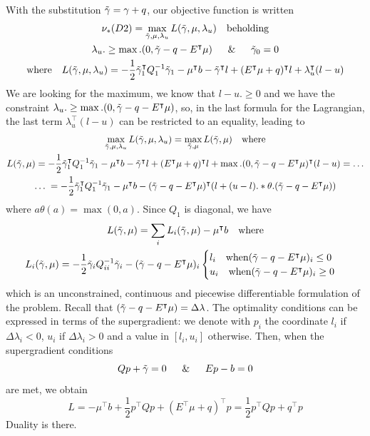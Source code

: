\documentclass[10pt,twoside,book,a5paper]{ncc}
\begin{document}
With the substitution $\Tilde{\gamma} = \gamma + q$, our objective function is written
    \begin{gather*}
    \nu_*(D2) = \max_{\Tilde{\gamma}, \mu, \lambda_u} L(\Tilde{\gamma}, \mu, \lambda_u) \quad \textrm{beholding} \\
    \lambda_u .\ge \max.(0, \Tilde{\gamma} - q - E^\intercal\mu) \quad \And \quad \Tilde{\gamma}_0 = 0    \\
    \textrm{where} \quad L(\Tilde{\gamma}, \mu, \lambda_u) = -\frac{1}{2} \Tilde{\gamma}_1^\intercal Q_1^{-1}\Tilde{\gamma}_1 - \mu^\intercal b - \Tilde{\gamma}^\intercal l + (E^\intercal\mu + q)^\intercal l + \lambda_u^\intercal(l-u)
    \end{gather*}
We are looking for the maximum, we know that $l-u .\ge 0$ and we have the constraint $\lambda_u .\ge \max.(0, \Tilde{\gamma} - q - E^\intercal\mu)$, so, in the last formula for the Lagrangian, the last term $\lambda_u^\intercal(l-u)$ can be restricted to an equality, leading to
\begin{gather*}
    \max_{\Tilde{\gamma}, \mu, \lambda_u} L(\Tilde{\gamma}, \mu, \lambda_u) = \max_{\Tilde{\gamma}, \mu} L(\tilde{\gamma}, \mu)  \quad \textrm{where} \\
    L(\tilde{\gamma}, \mu) = -\frac{1}{2} \Tilde{\gamma}_1^\intercal Q_1^{-1}\Tilde{\gamma}_1 - \mu^\intercal b - \Tilde{\gamma}^\intercal l + (E^\intercal\mu + q)^\intercal l + \max.(0, \Tilde{\gamma} - q - E^\intercal\mu)^\intercal(l-u) = \dots \\
    \dots \; = -\frac{1}{2} \Tilde{\gamma}_1^\intercal Q_1^{-1}\Tilde{\gamma}_1 - \mu^\intercal b -  (\Tilde{\gamma} - q - E^\intercal\mu)^\intercal(l + (u-l) .* \theta.(\Tilde{\gamma} - q - E^\intercal\mu))
\end{gather*}
where $a\theta(a) = \max(0, a)$. Since $Q_1$ is diagonal, we have
\begin{gather*}
    L(\tilde{\gamma}, \mu) = \sum_i L_i (\tilde{\gamma}, \mu) - \mu^\intercal b \quad \textrm{where} \\
    L_i (\tilde{\gamma}, \mu) = -\frac{1}{2} \Tilde{\gamma}_i Q_{ii}^{-1}\Tilde{\gamma}_i - (\Tilde{\gamma} - q - E^\intercal\mu)_i \begin{cases}
             l_i \quad \textrm{when} (\Tilde{\gamma} - q - E^\intercal\mu)_i \le 0 \\
             u_i \quad \textrm{when} (\Tilde{\gamma} - q - E^\intercal\mu)_i \ge 0
        \end{cases}
\end{gather*}
which is an unconstrained, continuous and piecewise differentiable formulation of the problem. Recall that $(\Tilde{\gamma} - q - E^\intercal\mu) = \Delta \lambda$.
The optimality conditions can be expressed in terms of the supergradient: we denote with $p_i$ the coordinate $l_i$ if $\Delta\lambda_i < 0$, $u_i$ if $\Delta\lambda_i > 0$ and a value in $[l_i, u_i]$ otherwise. Then, when the supergradient conditions
\[
    Q p + \Tilde{\gamma} = 0 \quad \And \quad E p - b = 0
\]
are met, we obtain
\[
L = -\mu^\intercal b + \frac{1}{2}p^\intercal Q p + (E^\intercal\mu + q)^\intercal p = \frac{1}{2}p^\intercal Q p + q^\intercal p
\]
Duality is there.
\end{document}

